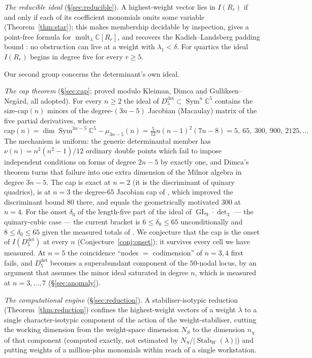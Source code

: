 \documentclass[11pt]{amsart}
\theoremstyle{plain}
\theoremstyle{definition}
\theoremstyle{remark}
\DeclareMathOperator{\GL}{GL}
\DeclareMathOperator{\Sym}{Sym}
\DeclareMathOperator{\mult}{mult}
\DeclareMathOperator{\Stab}{Stab}
\newcommand{\bC}{\mathbb{C}}
\newcommand{\Rr}{R}
\newcommand{\Ddet}{D^{\det}}
\begin{document}
\emph{The reducible ideal} (\S\ref{sec:reducible}).  A highest-weight vector
lies in $I(\Rr_r)$ if and only if each of its coefficient monomials omits some
variable (Theorem~\ref{thm:star}); this makes membership decidable by
inspection, gives a point-free formula for $\mult_\lambda\bC[\Rr_r]$, and
recovers the Kadish--Landsberg padding bound \cite{KL2}: no obstruction can
live at a weight with $\lambda_1<\delta$.  For quartics the ideal
$I(\Rr_r)$ begins in degree five for every $r\ge5$.

Our second group concerns the determinant's own ideal.

\emph{The cap theorem} (\S\ref{sec:cap}; proved modulo Kleiman, Dimca and
Gulliksen--Neg\aa rd, all adopted).  For every $n\ge2$ the ideal of
$\Ddet_5\subset\Sym^{n}\bC^{5}$ contains the size-$\mathrm{cap}(n)$ minors of the
degree-$(3n-5)$ Jacobian (Macaulay) matrix of the five partial derivatives,
where
\[
  \mathrm{cap}(n)=\dim\Sym^{3n-5}\bC^{5}-\mu_{3n-5}(n)=\tfrac{5}{12}n(n-1)^{2}(7n-8)
  =5,\ 65,\ 300,\ 900,\ 2125,\dots
\]
The mechanism is uniform: the generic determinantal member has
$\nu(n)=n^{2}(n^{2}-1)/12$ ordinary double points which fail to impose
independent conditions on forms of degree $2n-5$ by exactly one, and Dimca's
theorem \cite{Dimca13} turns that failure into one extra dimension of the
Milnor algebra in degree $3n-5$.  The cap is exact at $n=2$ (it is the
discriminant of quinary quadrics), is at $n=3$ the degree-$65$ Jacobian cap of
\cite[Prop.~4.23]{Companion}, which improved the discriminant bound $80$ there,
and equals the geometrically motivated $300$ at $n=4$.  For the onset
$\delta_0$ of the length-five part of the ideal of $\overline{\GL_9\cdot\det_3}$
--- the quinary-cubic case --- the current bracket is $6\le\delta_0\le65$
unconditionally and $8\le\delta_0\le65$ given the measured totals of
\cite{Companion}.  We conjecture that the cap is the onset of $I(\Ddet_5)$ at
every $n$ (Conjecture~\ref{conj:onset}); it survives every cell we have
measured.  At $n=5$ the coincidence ``nodes $=$ codimension'' of $n=3,4$ first
fails, and $\Ddet_5$ becomes a superabundant component of the $50$-nodal locus,
by an argument that assumes the minor ideal saturated in degree $n$, which is
measured at $n=3,\dots,7$ (\S\ref{sec:anomaly}).

\emph{The computational engine} (\S\ref{sec:reduction}).  A
stabiliser-isotypic reduction (Theorem~\ref{thm:reduction}) confines the
highest-weight vectors of a weight $\lambda$ to a single character-isotypic
component of the action of the weight-stabiliser, cutting the working
dimension from the weight-space dimension $N_S$ to the dimension $n_\chi$ of
that component (computed exactly, not estimated by $N_S/|\Stab_W(\lambda)|$)
and putting weights of a million-plus monomials within reach of a single
workstation.
\end{document}
